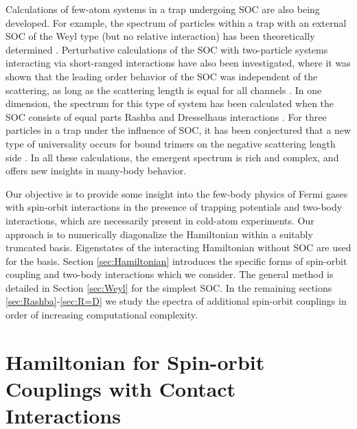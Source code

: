 \documentclass[%
 preprint,
 amsmath,amssymb,
 aps,
]{revtex4-1}
\begin{document}
Calculations of few-atom systems in a trap undergoing SOC are also being developed.  For example, the spectrum of particles within a trap with an external SOC of the Weyl type (but no relative interaction) has been theoretically determined \cite{anderson2013}.  Perturbative calculations of the SOC with two-particle systems interacting via short-ranged interactions have also been investigated, where it was shown that the leading order behavior of the SOC was independent of the scattering, as long as the scattering length is equal for all channels \cite{PhysRevA.89.033606}.  In one dimension, the spectrum for this type of system has been calculated when the SOC consists of equal parts Rashba and Dresselhaus interactions \cite{guan2014energy}.  For three particles in a trap under the influence of SOC, it has been conjectured that a new type of universality occurs for bound trimers on the negative scattering length side \cite{PhysRevLett.112.013201}.  In all these calculations, the emergent spectrum is rich and complex, and offers new insights in many-body behavior.

Our objective is to provide some insight into the few-body physics of Fermi gases with spin-orbit interactions in the presence of trapping potentials and two-body interactions, which are necessarily present in cold-atom experiments. Our approach is to numerically diagonalize the Hamiltonian within a suitably truncated basis. Eigenstates of the interacting Hamiltonian without SOC are used for the basis. Section \ref{sec:Hamiltonian} introduces the specific forms of spin-orbit coupling and two-body interactions which we consider. The general method is detailed in Section \ref{sec:Weyl} for the simplest SOC.  In the remaining sections \ref{sec:Rashba}-\ref{sec:R=D} we study the spectra of additional spin-orbit couplings in order of increasing computational complexity.

\section{\label{sec:Hamiltonian}Hamiltonian for Spin-orbit Couplings with Contact Interactions}
\end{document}

